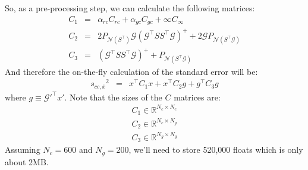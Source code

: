 \documentclass[11pt]{article}
\newcommand{\Gmat}{\mathcal{G}}
\newcommand{\PNmat}[1]{P_{\mathcal{N}\left(#1\right)}}
\begin{document}
So, as a pre-processing step, we can calculate the following matrices:
\begin{eqnarray}
	C_1 &=& \alpha_{rc} C_{rc} + \alpha_{gc} C_{gc} + \infty C_\infty \\
	C_2 &=& 2 \PNmat{S^\top} \Gmat \left(\Gmat^{\top}SS^{\top}\Gmat\right)^{+} + 2 \Gmat \PNmat{S^\top\Gmat} \\
	C_3 &=& \left(\Gmat^{\top}SS^{\top}\Gmat\right)^{+} + \PNmat{S^\top\Gmat} 
\end{eqnarray}
And therefore the on-the-fly calculation of the standard error will be:
\begin{eqnarray}
	{s_{cc,\bar{x}}}^2 &=& x^\top C_1 x + x^\top C_2 g + g^\top C_3 g
\end{eqnarray}
where $g \equiv \Gmat'^\top x'$. Note that the sizes of the $C$ matrices are:
\begin{eqnarray}
	C_1 \in \mathbb{R}^{N_c \times N_c} \\
	C_2 \in \mathbb{R}^{N_c \times N_g} \\
	C_3 \in \mathbb{R}^{N_g \times N_g}
\end{eqnarray}
Assuming $N_c = 600$ and $N_g = 200$, we'll need to store 520,000 floats which is only about 2MB.
\end{document}
